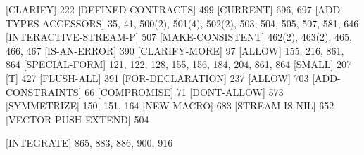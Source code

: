 [CLARIFY] {\footnotesize 222}
[DEFINED-CONTRACTS] {\footnotesize 499}
[CURRENT] {\footnotesize 696, 697}
[ADD-TYPES-ACCESSORS] {\footnotesize 35, 41, 500(2), 501(4), 502(2), 503, 504, 505, 
                507, 581, 646}
[INTERACTIVE-STREAM-P] {\footnotesize 507}
[MAKE-CONSISTENT] {\footnotesize 462(2), 463(2), 465, 466, 467}
[IS-AN-ERROR] {\footnotesize 390}
[CLARIFY-MORE] {\footnotesize 97}
[ALLOW] {\footnotesize 155, 216, 861, 864}
[SPECIAL-FORM] {\footnotesize 121, 122, 128, 155, 156, 184, 204, 861, 864}
[SMALL] {\footnotesize 207}
[T] {\footnotesize 427}
[FLUSH-ALL] {\footnotesize 391}
[FOR-DECLARATION] {\footnotesize 237}
[ALLOW] {\footnotesize 703}
[ADD-CONSTRAINTS] {\footnotesize 66}
[COMPROMISE] {\footnotesize 71}
[DONT-ALLOW] {\footnotesize 573}
[SYMMETRIZE] {\footnotesize 150, 151, 164}
[NEW-MACRO] {\footnotesize 683}
[STREAM-IS-NIL] {\footnotesize 652}
[VECTOR-PUSH-EXTEND] {\footnotesize 504}


[INTEGRATE] {\footnotesize 865, 883, 886, 900, 916}

\endlist
\endgroup

